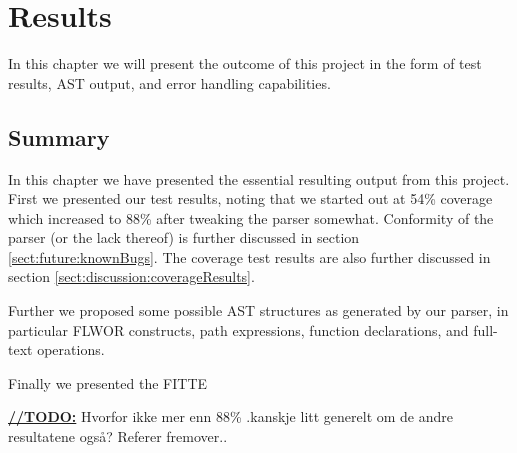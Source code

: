 \chapter{Results}
In this chapter we will present the outcome of this project in the form of test
results, AST output, and error handling capabilities.





\section{Summary}
In this chapter we have presented the essential resulting output from this
project. First we presented our test results, noting that we started out at   
54\% coverage which increased to 88\% after tweaking the parser somewhat.
Conformity of the parser (or the lack thereof) is further discussed in section
\ref{sect:future:knownBugs}. The coverage test results are also further
discussed in section \ref{sect:discussion:coverageResults}.

Further we proposed some possible AST structures as generated by our parser, in
particular FLWOR constructs, path expressions, function declarations, and
full-text operations.

Finally we presented the FITTE



\underline{\textbf{\LARGE //TODO:}} Hvorfor ikke mer enn 88\% .kanskje litt generelt om de andre resultatene ogs\aa ? Referer fremover..